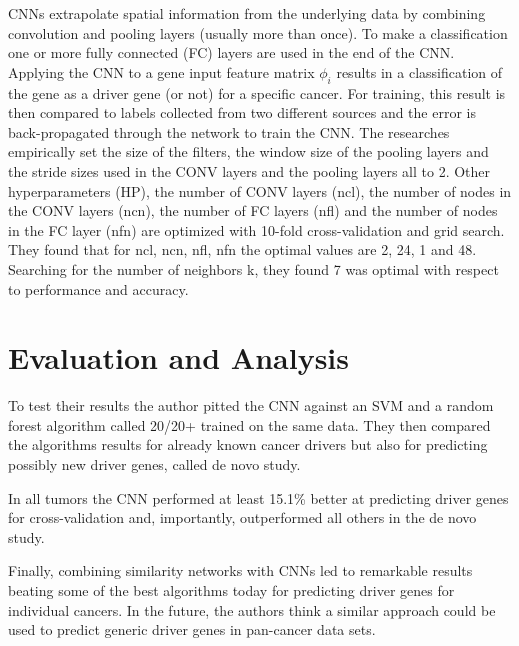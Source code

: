\documentclass[10pt]{article}
\begin{document}
CNNs extrapolate spatial information from the underlying data by combining convolution and pooling layers (usually more than once). To make a classification one or more fully connected (FC) layers are used in the end of the CNN. 
Applying the CNN to a gene input feature matrix $\phi_i$ results in a classification of the gene as a driver gene (or not) for a specific cancer.
For training, this result is then compared to labels collected from two different sources and the error is back-propagated through the network to train the CNN. 
The researches empirically set the size of the filters, the window size of the pooling layers and the stride sizes used in the CONV layers and the pooling layers all to 2. Other hyperparameters (HP), the number of CONV layers (ncl), the number of nodes in the CONV layers (ncn), the number of FC layers (nfl) and the number of nodes in the FC layer (nfn) are optimized with 10-fold cross-validation and grid search. They found that for ncl, ncn, nfl, nfn the optimal values are 2, 24, 1 and 48. Searching for the number of neighbors k, they found 7 was optimal with respect to performance and accuracy.

\section*{Evaluation and Analysis}
To test their results the author pitted the CNN against an SVM and a random forest algorithm called 20/20+ trained on the same data. They then compared the algorithms results for already known cancer drivers but also for predicting possibly new driver genes, called de novo study.

In all tumors the CNN performed at least 15.1\% better at predicting driver genes for cross-validation and, importantly, outperformed all others in the de novo study. 

Finally, combining similarity networks with CNNs led to remarkable results beating some of the best algorithms today for predicting driver genes for individual cancers. In the future, the authors think a similar approach could be used to predict generic driver genes in pan-cancer data sets. 


\end{document}
